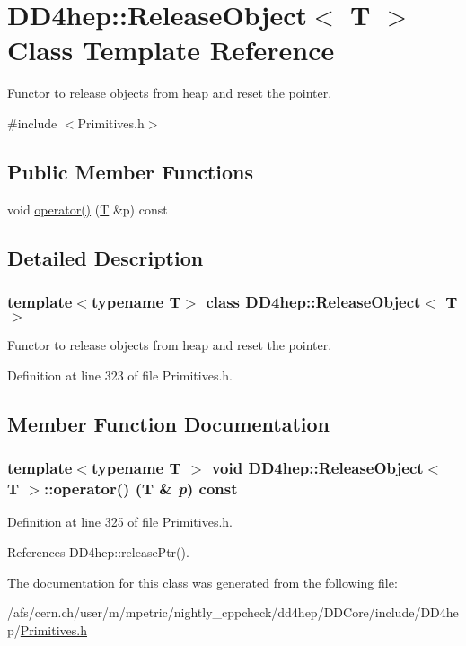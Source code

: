 \hypertarget{class_d_d4hep_1_1_release_object}{
\section{DD4hep::ReleaseObject$<$ T $>$ Class Template Reference}
\label{class_d_d4hep_1_1_release_object}
}


Functor to release objects from heap and reset the pointer.  


{\ttfamily \#include $<$Primitives.h$>$}\subsection*{Public Member Functions}
\begin{DoxyCompactItemize}
\item 
void \hyperlink{class_d_d4hep_1_1_release_object_a21d5e27e9d30418be18218ffe30fbeab}{operator()} (\hyperlink{class_t}{T} \&p) const 
\end{DoxyCompactItemize}


\subsection{Detailed Description}
\subsubsection*{template$<$typename T$>$ class DD4hep::ReleaseObject$<$ T $>$}

Functor to release objects from heap and reset the pointer. 

Definition at line 323 of file Primitives.h.

\subsection{Member Function Documentation}
\hypertarget{class_d_d4hep_1_1_release_object_a21d5e27e9d30418be18218ffe30fbeab}{
\subsubsection[{operator()}]{\setlength{\rightskip}{0pt plus 5cm}template$<$typename T $>$ void {\bf DD4hep::ReleaseObject}$<$ {\bf T} $>$::operator() ({\bf T} \& {\em p}) const}}
\label{class_d_d4hep_1_1_release_object_a21d5e27e9d30418be18218ffe30fbeab}


Definition at line 325 of file Primitives.h.

References DD4hep::releasePtr().

The documentation for this class was generated from the following file:\begin{DoxyCompactItemize}
\item 
/afs/cern.ch/user/m/mpetric/nightly\_\-cppcheck/dd4hep/DDCore/include/DD4hep/\hyperlink{_primitives_8h}{Primitives.h}\end{DoxyCompactItemize}

